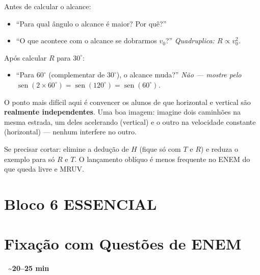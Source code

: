 \documentclass[12pt,a4paper]{article}
\newcommand{\tempo}[1]{%
  \begin{flushright}
    \colorbox{azulphysics!20}{\small\textbf{\faClock\ \textasciitilde{}#1 min}}
  \end{flushright}\vspace{-0.5em}
}
\begin{document}
\begin{tcolorbox}[perguntabox]
  Antes de calcular o alcance:
  \begin{itemize}[nosep]
    \item ``Para qual \^angulo o alcance \'e maior? Por qu\^e?''
    \item ``O que acontece com o alcance se dobrarmos $v_0$?''
          \textit{Quadruplica: $R \propto v_0^2$.}
  \end{itemize}
  Ap\'os calcular $R$ para $30^\circ$:
  \begin{itemize}[nosep]
    \item ``Para $60^\circ$ (complementar de $30^\circ$), o alcance
          muda?'' \textit{N\~ao --- mostre pelo $\operatorname{sen}(2\times60^\circ)
          = \operatorname{sen}(120^\circ) = \operatorname{sen}(60^\circ)$.}
  \end{itemize}
\end{tcolorbox}

\begin{tcolorbox}[dicabox]
  O ponto mais dif\'icil aqui \'e convencer os alunos de que
  horizontal e vertical s\~ao \textbf{realmente independentes}.
  Uma boa imagem: imagine dois caminh\~oes na mesma estrada, um
  deles acelerando (vertical) e o outro na velocidade constante
  (horizontal) --- nenhum interfere no outro.
\end{tcolorbox}

\begin{tcolorbox}[cortebox]
  Se precisar cortar: elimine a dedu\c{c}\~ao de $H$ (fique s\'o com
  $T$ e $R$) e reduza o exemplo para s\'o $R$ e $T$.
  O lan\c{c}amento obl\'iquo \'e menos frequente no ENEM do que
  queda livre e MRUV.
\end{tcolorbox}

\newpage

\section*{Bloco 6 \hfill\colorbox{verdeok!30}{\small ESSENCIAL}}
\section*{\hspace{1.2em}Fixa\c{c}\~ao com Quest\~oes de ENEM}
\tempo{20--25}
\end{document}

